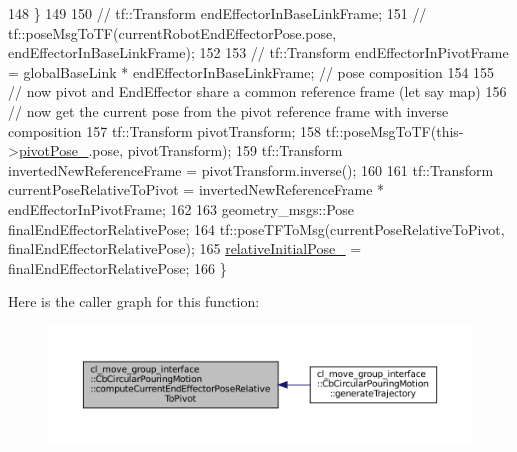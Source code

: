 \begin{DoxyCode}
148         \}
149 
150         \textcolor{comment}{// tf::Transform endEffectorInBaseLinkFrame;}
151         \textcolor{comment}{// tf::poseMsgToTF(currentRobotEndEffectorPose.pose, endEffectorInBaseLinkFrame);}
152 
153         \textcolor{comment}{// tf::Transform endEffectorInPivotFrame = globalBaseLink * endEffectorInBaseLinkFrame; // pose
       composition}
154 
155         \textcolor{comment}{// now pivot and EndEffector share a common reference frame (let say map)}
156         \textcolor{comment}{// now get the current pose from the pivot reference frame with inverse composition}
157         tf::Transform pivotTransform;
158         tf::poseMsgToTF(this->\hyperlink{classcl__move__group__interface_1_1CbCircularPouringMotion_a58ce9c29e4ef8f09a7569d6d8f9df56b}{pivotPose\_}.pose, pivotTransform);
159         tf::Transform invertedNewReferenceFrame = pivotTransform.inverse();
160 
161         tf::Transform currentPoseRelativeToPivot = invertedNewReferenceFrame * endEffectorInPivotFrame;
162 
163         geometry\_msgs::Pose finalEndEffectorRelativePose;
164         tf::poseTFToMsg(currentPoseRelativeToPivot, finalEndEffectorRelativePose);
165         \hyperlink{classcl__move__group__interface_1_1CbCircularPouringMotion_ab6323315364e1f8bc60cbad3daa72fa9}{relativeInitialPose\_} = finalEndEffectorRelativePose;
166     \}
\end{DoxyCode}
Here is the caller graph for this function\+:
\nopagebreak
\begin{figure}[H]
\begin{center}
\leavevmode
\includegraphics[width=350pt]{classcl__move__group__interface_1_1CbCircularPouringMotion_a4986b396e0ba318a0046feea3f6eede6_icgraph}
\end{center}
\end{figure}
\mbox{\label{classcl__move__group__interface_1_1CbCircularPouringMotion_a26d603b1d9bdbf5b71da6c1c4af2c322}} 
